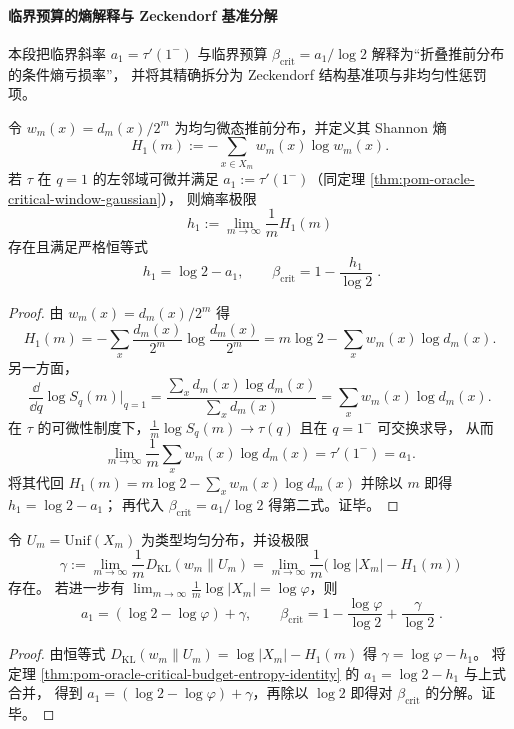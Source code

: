 \paragraph{临界预算的熵解释与 Zeckendorf 基准分解}
本段把临界斜率 \(a_1=\tau'(1^-)\) 与临界预算 \(\beta_{\mathrm{crit}}=a_1/\log 2\) 解释为“折叠推前分布的条件熵亏损率”，
并将其精确拆分为 Zeckendorf 结构基准项与非均匀性惩罚项。

\begin{theorem}[临界预算的熵恒等式]\label{thm:pom-oracle-critical-budget-entropy-identity}
令 \(w_m(x)=d_m(x)/2^m\) 为均匀微态推前分布，并定义其 Shannon 熵
\[
H_1(m):=-\sum_{x\in X_m}w_m(x)\log w_m(x).
\]
若 \(\tau\) 在 \(q=1\) 的左邻域可微并满足 \(a_1:=\tau'(1^-)\)（同定理 \ref{thm:pom-oracle-critical-window-gaussian}），
则熵率极限
\[
h_1:=\lim_{m\to\infty}\frac{1}{m}H_1(m)
\]
存在且满足严格恒等式
\[
\boxed{\;
h_1=\log 2-a_1,\qquad
\beta_{\mathrm{crit}}=1-\frac{h_1}{\log 2}\; } .
\]
\end{theorem}
\begin{proof}
由 \(w_m(x)=d_m(x)/2^m\) 得
\[
H_1(m)
=-\sum_x \frac{d_m(x)}{2^m}\log\frac{d_m(x)}{2^m}
=m\log 2-\sum_x w_m(x)\log d_m(x).
\]
另一方面，
\[
\frac{\dd}{\dd q}\log S_q(m)\Big|_{q=1}
=\frac{\sum_x d_m(x)\log d_m(x)}{\sum_x d_m(x)}
=\sum_x w_m(x)\log d_m(x).
\]
在 \(\tau\) 的可微性制度下，\(\frac{1}{m}\log S_q(m)\to\tau(q)\) 且在 \(q=1^-\) 可交换求导，
从而
\[
\lim_{m\to\infty}\frac{1}{m}\sum_x w_m(x)\log d_m(x)
=\tau'(1^-)=a_1.
\]
将其代回 \(H_1(m)=m\log 2-\sum_x w_m(x)\log d_m(x)\) 并除以 \(m\) 即得 \(h_1=\log 2-a_1\)；
再代入 \(\beta_{\mathrm{crit}}=a_1/\log 2\) 得第二式。证毕。
\end{proof}

\begin{theorem}\label{thm:pom-oracle-critical-budget-zeckendorf-plus-gap}
令 \(U_m=\mathrm{Unif}(X_m)\) 为类型均匀分布，并设极限
\[
\gamma:=\lim_{m\to\infty}\frac{1}{m}D_{\mathrm{KL}}(w_m\|U_m)
=\lim_{m\to\infty}\frac{1}{m}\bigl(\log|X_m|-H_1(m)\bigr)
\]
存在。
若进一步有 \(\lim_{m\to\infty}\frac{1}{m}\log|X_m|=\log\varphi\)，则
\[
\boxed{\;
a_1=(\log 2-\log\varphi)+\gamma,\qquad
\beta_{\mathrm{crit}}=1-\frac{\log\varphi}{\log 2}+\frac{\gamma}{\log 2}\; } .
\]
\end{theorem}
\begin{proof}
由恒等式 \(D_{\mathrm{KL}}(w_m\|U_m)=\log|X_m|-H_1(m)\) 得
\(
\gamma=\log\varphi-h_1
\)。
将定理 \ref{thm:pom-oracle-critical-budget-entropy-identity} 的 \(a_1=\log 2-h_1\) 与上式合并，
得到 \(a_1=(\log 2-\log\varphi)+\gamma\)，再除以 \(\log 2\) 即得对 \(\beta_{\mathrm{crit}}\) 的分解。证毕。
\end{proof}

\endinput


